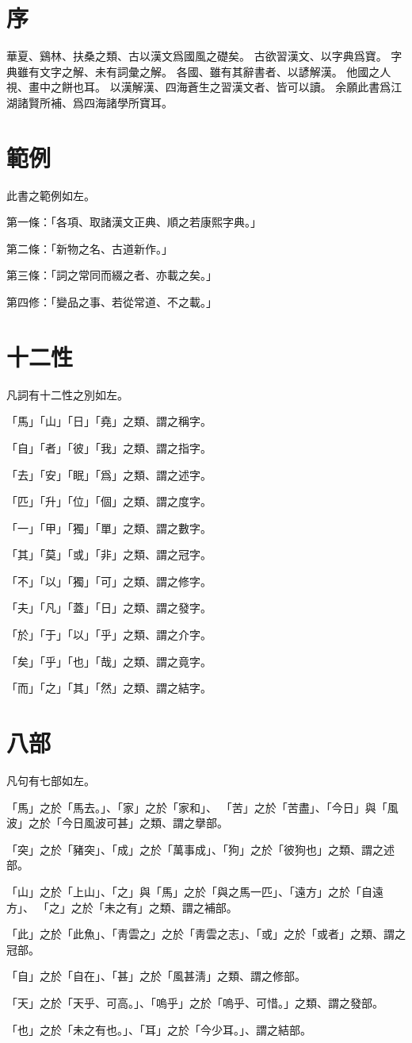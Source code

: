 \section{序}
華夏、鷄林、扶桑之類、古以漢文爲國風之礎矣。
古欲習漢文、以字典爲寶。
字典雖有文字之解、未有詞彙之解。
各國、雖有其辭書者、以諺解漢。
他國之人視、畫中之餅也耳。
以漢解漢、四海蒼生之習漢文者、皆可以讀。
余願此書爲江湖諸賢所補、爲四海諸學所寶耳。
\section{範例}
此書之範例如左。
\par 第一條：「各項、取諸漢文正典、順之若康熙字典。」
\par 第二條：「新物之名、古道新作。」
\par 第三條：「詞之常同而綴之者、亦載之矣。」
\par 第四修：「變品之事、若從常道、不之載。」
\section{十二性}
\par 凡詞有十二性之別如左。
\par 「馬」「山」「日」「堯」之類、謂之稱字。
\par 「自」「者」「彼」「我」之類、謂之指字。
\par 「去」「安」「眠」「爲」之類、謂之述字。
\par 「匹」「升」「位」「個」之類、謂之度字。
\par 「一」「甲」「獨」「單」之類、謂之數字。
\par 「其」「莫」「或」「非」之類、謂之冠字。
\par 「不」「以」「獨」「可」之類、謂之修字。
\par 「夫」「凡」「蓋」「日」之類、謂之發字。
\par 「於」「于」「以」「乎」之類、謂之介字。
\par 「矣」「乎」「也」「哉」之類、謂之竟字。
\par 「而」「之」「其」「然」之類、謂之結字。
\section{八部}
\par 凡句有七部如左。
\par 「馬」之於「馬去。」、「家」之於「家和」、
「苦」之於「苦盡」、「今日」與「風波」之於「今日風波可甚」之類、謂之擧部。
\par 「突」之於「豬突」、「成」之於「萬事成」、「狗」之於「彼狗也」之類、謂之述部。
\par 「山」之於「上山」、「之」與「馬」之於「與之馬一匹」、「遠方」之於「自遠方」、
「之」之於「未之有」之類、謂之補部。
\par 「此」之於「此魚」、「靑雲之」之於「靑雲之志」、「或」之於「或者」之類、謂之冠部。
\par 「自」之於「自在」、「甚」之於「風甚淸」之類、謂之修部。
\par 「天」之於「天乎、可高。」、「嗚乎」之於「嗚乎、可惜。」之類、謂之發部。
\par 「也」之於「未之有也。」、「耳」之於「今少耳。」、謂之結部。

